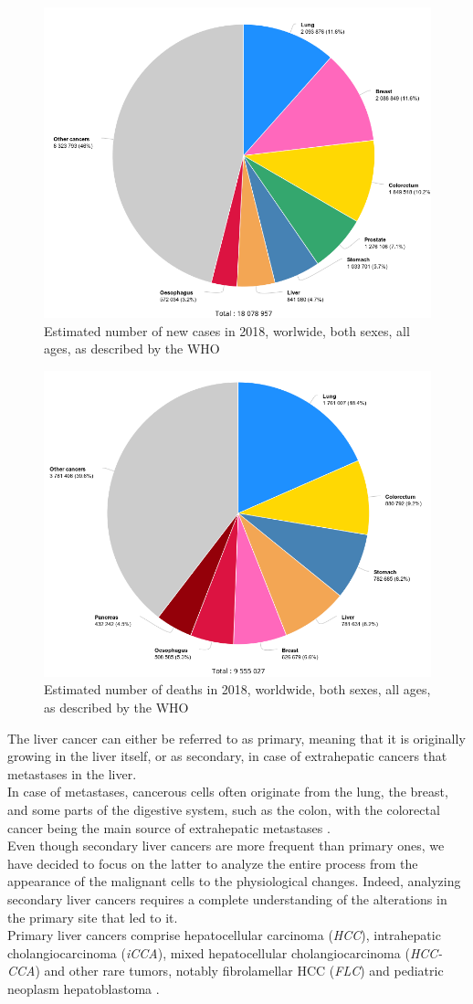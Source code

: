 \documentclass[]{article}
\begin{document}
\begin{figure}[th!]
\centering
\includegraphics[width=0.7\linewidth]{images/cancerNewCases}
\caption{Estimated number of new cases in 2018, worlwide, both sexes, all ages, as described by the WHO \cite{OMS}}
\label{fig:cancerNewCases}
\end{figure}
\begin{figure}[th!]
\centering
\includegraphics[width=0.7\linewidth]{images/cancerMortality}
\caption{Estimated number of deaths in 2018, worldwide, both sexes, all ages, as described by the WHO \cite{OMS}}
\label{fig:cancerMortality}
\end{figure}

The liver cancer can either be referred to as primary, meaning that it
is originally growing in the liver itself, or as secondary, in case of
extrahepatic cancers that metastases in the liver.\\
In case of metastases, cancerous cells often originate from the lung,
the breast, and some parts of the digestive system, such as the colon,
with the colorectal cancer being the main source of extrahepatic
metastases \cite{Hoyer2012a, Sahani2014}. \\
Even though secondary liver cancers are more frequent than primary ones,
we have decided to focus on the latter to analyze the entire process
from the appearance of the malignant cells to the physiological changes.
Indeed, analyzing secondary liver cancers requires a complete
understanding of the alterations in the primary site that led to it.\\
Primary liver cancers comprise hepatocellular carcinoma (\emph{HCC}),
intrahepatic cholangiocarcinoma (\emph{iCCA}), mixed hepatocellular
cholangiocarcinoma (\emph{HCC-CCA}) and other rare tumors, notably
fibrolamellar HCC (\emph{FLC}) and pediatric neoplasm hepatoblastoma
\cite{Sia2017, Lozano2012,20113051318}.
\end{document}
